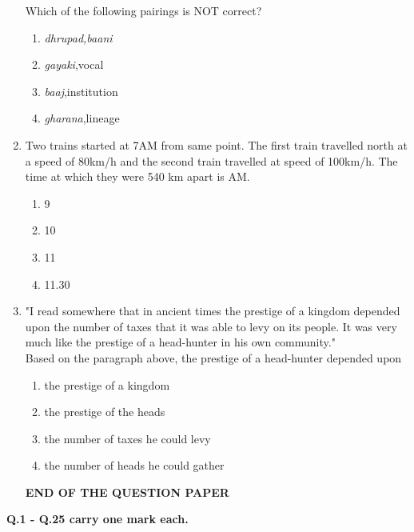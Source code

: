 \documentclass[12pt]{article}
\begin{document}
\begin{enumerate}[start=6,label=Q.\arabic*]
		Which of the following pairings is NOT correct?
		\begin{enumerate}[label=(\Alph*)]
			\item \textit{dhrupad,baani}
			\item \textit{gayaki},vocal
			\item \textit{baaj},institution
			\item \textit{gharana},lineage
		\end{enumerate}
		\vfill
		\newpage
	\item Two trains started at 7AM from same point. The first train travelled north at a speed of 80km/h and the second train travelled at speed of 100km/h. The time at which they were 540 km apart is \underline{\hspace{2cm}}AM.
		\begin{multicols}{4}
			\begin{enumerate}[label=(\Alph*)]
				\item 9 \item 10 \item 11 \item 11.30
			\end{enumerate}
		\end{multicols}
	\item "I read somewhere that in ancient times the prestige of a kingdom depended upon the number of taxes that it was able to levy on its people. It was very much like the prestige of a head-hunter in his own community."\\
		Based on the paragraph above, the prestige of a head-hunter depended upon \underline{\hspace{2cm}}
		\begin{enumerate}[label=(\Alph*)]
			\item the prestige of a kingdom
			\item the prestige of the heads
			\item the number of taxes he could levy
			\item the number of heads he could gather
		\end{enumerate}
		\vspace{\baselineskip}
		\begin{center}
			{\textbf{END OF THE QUESTION PAPER}}
		\end{center}
		\newpage
\end{enumerate}
\setcounter{page}{1}
\noindent\textbf{Q.1 - Q.25 carry one mark each.}
\end{document}
